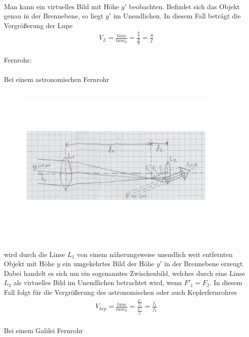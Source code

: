 \documentclass[a4paper,10pt]{scrartcl}
\begin{document}
\FloatBarrier
			\\
			Man kann ein virtuelles Bild mit Höhe \(y'\) beobachten. Befindet sich das Objekt genau in der Brennebene, so liegt \(y'\) im Unendlichen. In diesem Fall beträgt die Vergrößerung der Lupe
			\begin{align*}
			V_{L}=\frac{tan\epsilon}{tan\epsilon_{0}}=\frac{\frac{y}{f}}{\frac{y}{S}}=\frac{S}{f}
			\end{align*}
			\\
			Fernrohr:\\
			\\
			Bei einem astronomischen Fernrohr\\
			\\
	\begin{figure}[h]
\centering
\includegraphics[width=0.9\textwidth]{./Bilder/og5}
\end{figure}
\FloatBarrier			\\
			wird durch die Linse \(L_{1}\) von einem näherungsweise unendlich weit entfernten Objekt mit Höhe \(y\) ein umgekehrtes Bild der Höhe \(y'\) in der Brennebene erzeugt. Dabei handelt es sich um ein sogenanntes Zwischenbild, welches durch eine Linse \(L_{2}\) als virtuelles Bild im Unendlichen betrachtet wird, wenn \(F'_{1}=F_{2}\). In diesem Fall folgt für die Vergrößerung des astronomischen oder auch Keplerfernrohres
			\begin{align*}
			V_{kep}=\frac{tan\epsilon}{tan\epsilon_{0}}=\frac{\frac{y'_{1}}{f_{2}}}{\frac{y'_{1}}{f_{1}}}=\frac{f_{1}}{f_{2}}
			\end{align*}
			\\
			Bei einem Galilei Fernrohr\\
			\\
\end{document}
